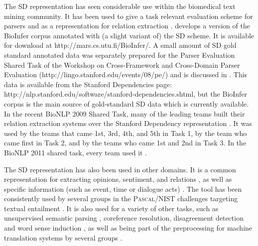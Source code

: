 \documentclass[11pt,letter]{article}
\def\url#1{\textsf{#1}}
\begin{document}
The SD representation has seen considerable use within the biomedical text
mining community.  It has been used to give a task relevant evaluation
scheme for parsers \citep{Clegg07,Pyysalo07} and as a representation
for relation extraction
\citep{Erkan07,Greenwood07,Urbain07,Fundel07,Clegg08,Pyysalo08,giles08large,ozgur08identifying,ramakrishnan08discovery,bjorne08how,Yarten10,Bjorne2011,Pyysalo11,Landeghem12}.
\citet{Pyysalo07} develops a version of the BioInfer corpus annotated
with (a slight variant of) the SD scheme.  It is available for
download at \url{http://mars.cs.utu.fi/BioInfer/}.
A small amount of SD gold standard annotated data was separately prepared for the
Parser Evaluation Shared Task of the Workshop on Cross-Framework and
Cross-Domain Parser Evaluation
(\url{http://lingo.stanford.edu/events/08/pe/}) and is discussed in
\citep{demarneffe08stanford}. This data is available from the Stanford
Dependencies page: \url{http://nlp.stanford.edu/software\discretionary{}{}{}/stanford-dependencies.shtml},
but the BioInfer corpus is the main source of gold-standard SD data which is currently available.
In the recent BioNLP 2009 Shared Task, many of the leading teams built their relation extraction systems over the Stanford Dependency representation \citep{kim09overview}.  It was used by the teams that came 1st, 3rd, 4th, and 5th in Task 1, by the team who came first in Task 2, and by the teams who came 1st and 2nd in Task 3. In the BioNLP 2011 shared task, every team used it \citep{BioNLP11}.

The SD representation has also been used in other domains.  It is a common representation for
extracting opinions, sentiment, and relations
\citep{Zhuang06cikm,Meena07sentiment,Banko07,Zouaq06tai,Zouaq07tel,chaumartin07knowledge,kessler08icwsm,Haghighi10,Hassan10,Joshi2010,Wu2010,Zouaq10}, as well as specific information (such as event, time or dialogue acts) \citep{Chambers11,McClosky12,Kluwer10}. The tool has been consistently used by several groups in the \textsc{Pascal}/NIST challenges targeting textual entailment \citep{adams-EtAl:2007:WTEP,blake:2007:WTEP,chambers-EtAl:2007:WTEP,harmeling:2007:WTEP,wang-neumann:2007:WTEP,Malakasiotis09,Mehdad09,Shivare2010,Glinos2010,Kouylekov2010,Pakray2011a}. It is also used for a variety of other tasks, such as unsupervised semantic parsing \citep{poon09unsupervised}, coreference resolution, disagreement detection and word sense induction \citep{Chen12,Abbott11,Lau12}, as well as being part of the preprocessing for machine translation systems by several groups \citep{xu09using,genzel10automatically,singh10statistical}.
\end{document}
